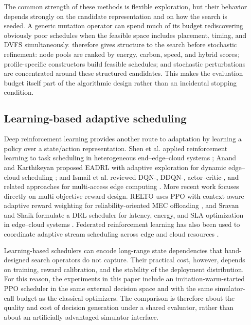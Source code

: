 The common strength of these methods is flexible exploration, but their behavior depends strongly on the candidate representation and on how the search is seeded. A generic mutation operator can spend much of its budget rediscovering obviously poor schedules when the feasible space includes placement, timing, and DVFS simultaneously. \method therefore gives structure to the search before stochastic refinement: node pools are ranked by energy, carbon, speed, and hybrid scores; profile-specific constructors build feasible schedules; and stochastic perturbations are concentrated around these structured candidates. This makes the evaluation budget itself part of the algorithmic design rather than an incidental stopping condition.

\subsection{Learning-based adaptive scheduling}

Deep reinforcement learning provides another route to adaptation by learning a policy over a state/action representation. Shen et al. applied reinforcement learning to task scheduling in heterogeneous end--edge--cloud systems \cite{shen2025reinforcement}; Anand and Karthikeyan proposed EADRL with adaptive exploration for dynamic edge--cloud scheduling \cite{anand2025eadrl}; and Ismail et al. reviewed DQN-, DDQN-, actor--critic-, and related approaches for multi-access edge computing \cite{ismail2025survey}. More recent work focuses directly on multi-objective reward design. RELTO uses PPO with context-aware adaptive reward weighting for reliability-oriented MEC offloading \cite{nasir2026relto}, and Sravan and Shaik formulate a DRL scheduler for latency, energy, and SLA optimization in edge--cloud systems \cite{sravan2026drl}. Federated reinforcement learning has also been used to coordinate adaptive stream scheduling across edge and cloud resources \cite{lajili2026federated}.

Learning-based schedulers can encode long-range state dependencies that hand-designed search operators do not capture. Their practical cost, however, depends on training, reward calibration, and the stability of the deployment distribution. For this reason, the experiments in this paper include an imitation-warm-started PPO scheduler in the same external decision space and with the same simulator-call budget as the classical optimizers. The comparison is therefore about the quality and cost of decision generation under a shared evaluator, rather than about an artificially advantaged simulator interface.

